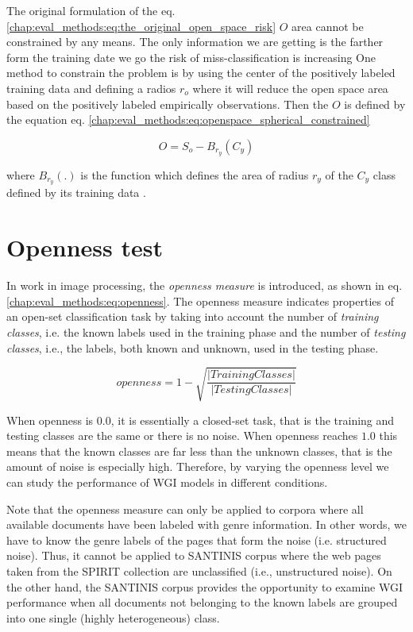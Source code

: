The original formulation of the eq. \ref{chap:eval_methods:eq:the_original_open_space_risk} $O$ area cannot be constrained by any means. The only information we are getting is the farther form the training date we go the risk of miss-classification is increasing One method to constrain the problem is by using the center of the positively labeled training data and defining a radios $r_{o}$ where it will reduce the open space area based on the positively labeled empirically observations. Then the $O$ is defined by the equation eq. \ref{chap:eval_methods:eq:openspace_spherical_constrained}

\begin{equation}\label{chap:eval_methods:eq:openspace_spherical_constrained}
	O = S_{o} - B_{r_{y}}(C_{y})
\end{equation}

\noindent
where $B_{r_{y}}(.)$ is the function which defines the area of radius $r_{y}$ of the $C_{y}$ class defined by its training data \parencite{fei2016breaking}.

\section{Openness test}\label{chap:eval_methods:sec:open_space_risk}

In \parencite{scheirer2013toward} work in image processing, the \textit{openness measure} is introduced, as shown in eq. \ref{chap:eval_methods:eq:openness}. The openness measure indicates properties of an open-set classification task by taking into account the number of \textit{training classes}, i.e. the known labels used in the training phase and the number of \textit{testing classes}, i.e., the labels, both known and unknown, used in the testing phase.

\begin{equation}\label{chap:eval_methods:eq:openness}
	openness=1-\sqrt{\frac{ | Training Classes | }{ |Testing Classes | }}
\end{equation}

When openness is $0.0$, it is essentially a closed-set task, that is the training and testing classes are the same or there is no noise. When openness reaches $1.0$ this means that the known classes are far less than the unknown classes, that is the amount of noise is especially high. Therefore, by varying the openness level we can study the performance of WGI models in different conditions.

Note that the openness measure can only be applied to corpora where all available documents have been labeled with genre information. In other words, we have to know the genre labels of the pages that form the noise (i.e. structured noise). Thus, it cannot be applied to SANTINIS corpus where the web pages taken from the SPIRIT collection are unclassified (i.e., unstructured noise). On the other hand, the SANTINIS corpus provides the opportunity to examine WGI performance when all documents not belonging to the known labels are grouped into one single (highly heterogeneous) class.



